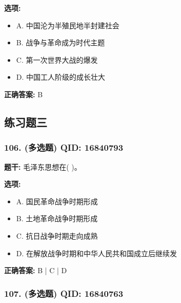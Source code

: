 \documentclass[12pt,UTF8]{ctexart}
\begin{document}
\textbf{选项:}
\begin{itemize}[leftmargin=*]

  \item A. 中国沦为半殖民地半封建社会

  \item B. 战争与革命成为时代主题

  \item C. 第一次世界大战的爆发

  \item D. 中国工人阶级的成长壮大

\end{itemize}

\textbf{正确答案:}
B

\vspace{0.3em}\hrulefill\vspace{0.7em}

\subsection*{练习题三}

\subsubsection*{106. (多选题) \small QID: 16840793}

\textbf{题干:}
毛泽东思想在( )。

\textbf{选项:}
\begin{itemize}[leftmargin=*]

  \item A. 国民革命战争时期形成

  \item B. 土地革命战争时期形成

  \item C. 抗日战争时期走向成熟

  \item D. 在解放战争时期和中华人民共和国成立后继续发

\end{itemize}

\textbf{正确答案:}
B | C | D

\vspace{0.3em}\hrulefill\vspace{0.7em}

\subsubsection*{107. (多选题) \small QID: 16840763}
\end{document}
